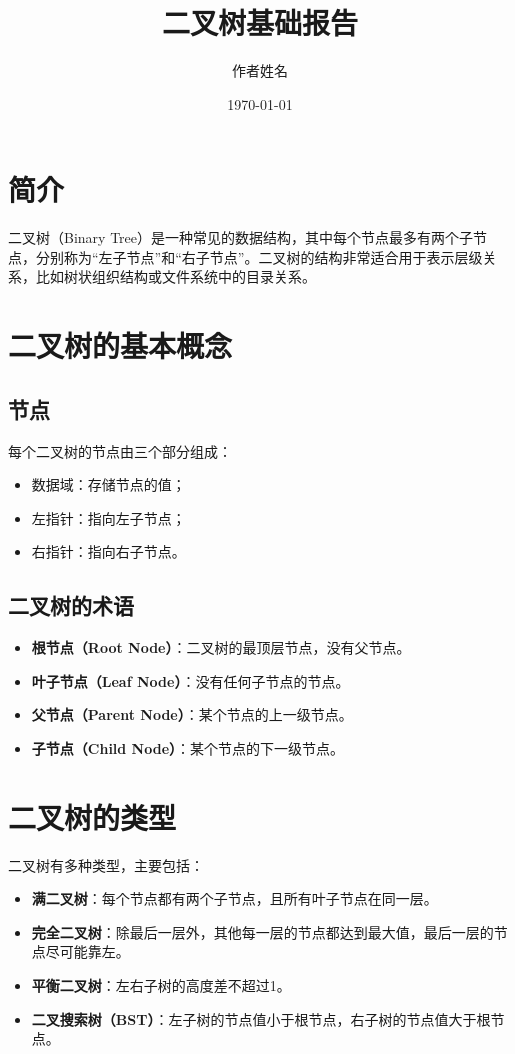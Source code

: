 \documentclass[a4paper,12pt]{report}
\title{二叉树基础报告}
\author{作者姓名}
\date{\today}
\begin{document}
\maketitle



\section{简介}

二叉树（Binary Tree）是一种常见的数据结构，其中每个节点最多有两个子节点，分别称为“左子节点”和“右子节点”。二叉树的结构非常适合用于表示层级关系，比如树状组织结构或文件系统中的目录关系。

\section{二叉树的基本概念}

\subsection{节点}
每个二叉树的节点由三个部分组成：
\begin{itemize}
    \item 数据域：存储节点的值；
    \item 左指针：指向左子节点；
    \item 右指针：指向右子节点。
\end{itemize}

\subsection{二叉树的术语}
\begin{itemize}
    \item \textbf{根节点（Root Node）}：二叉树的最顶层节点，没有父节点。
    \item \textbf{叶子节点（Leaf Node）}：没有任何子节点的节点。
    \item \textbf{父节点（Parent Node）}：某个节点的上一级节点。
    \item \textbf{子节点（Child Node）}：某个节点的下一级节点。
\end{itemize}

\section{二叉树的类型}

二叉树有多种类型，主要包括：
\begin{itemize}
    \item \textbf{满二叉树}：每个节点都有两个子节点，且所有叶子节点在同一层。
    \item \textbf{完全二叉树}：除最后一层外，其他每一层的节点都达到最大值，最后一层的节点尽可能靠左。
    \item \textbf{平衡二叉树}：左右子树的高度差不超过1。
    \item \textbf{二叉搜索树（BST）}：左子树的节点值小于根节点，右子树的节点值大于根节点。
\end{itemize}
\end{document}

